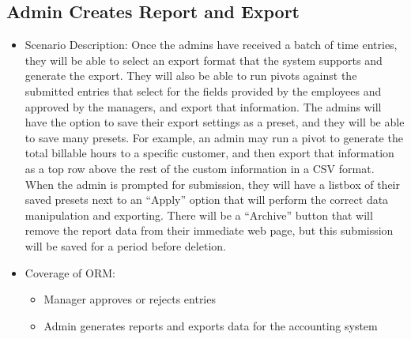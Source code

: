 \documentclass[12pt]{article}
\begin{document}
\subsection{ Admin Creates Report and Export}
\begin{itemize}
\item Scenario Description:
Once the admins have received a batch of time entries, they will be able to select an export format that the system supports and generate the export. They will also be able to run pivots against the submitted entries that select for the fields provided by the employees and approved by the managers, and export that information. The admins will have the option to save their export settings as a preset, and they will be able to save many presets. For example, an admin may run a pivot to generate the total billable hours to a specific customer, and then export that information as a top row above the rest of the custom information in a CSV format. When the admin is prompted for submission, they will have a listbox of their saved presets next to an “Apply” option that will perform the correct data manipulation and exporting. There will be a “Archive” button that will remove the report data from their immediate web page, but this submission will be saved for a period before deletion.
\item Coverage of ORM:
\begin{itemize}
\item Manager approves or rejects entries\\
\item Admin generates reports and exports data for the accounting system
\end{itemize}
\end{itemize}
\end{document}
